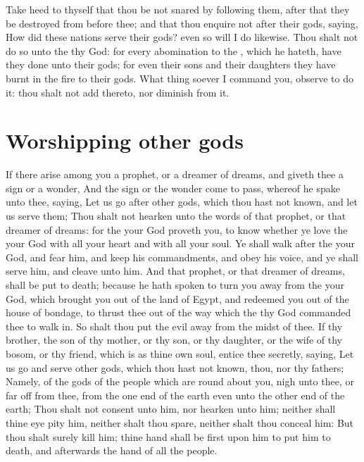 \begin{biblechapter}
\verse Take heed to thyself that thou be not snared by following them, after that they be destroyed from before thee; and that thou enquire not after their gods, saying, How did these nations serve their gods? even so will I do likewise.
\verse Thou shalt not do so unto the \LORD thy God: for every abomination to the \LORD, which he hateth, have they done unto their gods; for even their sons and their daughters they have burnt in the fire to their gods.
\verse What thing soever I command you, observe to do it: thou shalt not add thereto, nor diminish from it.
\end{biblechapter}

\section*{Worshipping other gods}
\begin{biblechapter} %
\verse If there arise among you a prophet, or a dreamer of dreams, and giveth thee a sign or a wonder,
\verse And the sign or the wonder come to pass, whereof he spake unto thee, saying, Let us go after other gods, which thou hast not known, and let us serve them;
\verse Thou shalt not hearken unto the words of that prophet, or that dreamer of dreams: for the \LORD your God proveth you, to know whether ye love the \LORD your God with all your heart and with all your soul.
\verse Ye shall walk after the \LORD your God, and fear him, and keep his commandments, and obey his voice, and ye shall serve him, and cleave unto him.
\verse And that prophet, or that dreamer of dreams, shall be put to death; because he hath spoken to turn you away from the \LORD your God, which brought you out of the land of Egypt, and redeemed you out of the house of bondage, to thrust thee out of the way which the \LORD thy God commanded thee to walk in. So shalt thou put the evil away from the midst of thee.
\verse If thy brother, the son of thy mother, or thy son, or thy daughter, or the wife of thy bosom, or thy friend, which is as thine own soul, entice thee secretly, saying, Let us go and serve other gods, which thou hast not known, thou, nor thy fathers;
\verse Namely, of the gods of the people which are round about you, nigh unto thee, or far off from thee, from the one end of the earth even unto the other end of the earth;
\verse Thou shalt not consent unto him, nor hearken unto him; neither shall thine eye pity him, neither shalt thou spare, neither shalt thou conceal him:
\verse But thou shalt surely kill him; thine hand shall be first upon him to put him to death, and afterwards the hand of all the people.

\end{biblechapter}
